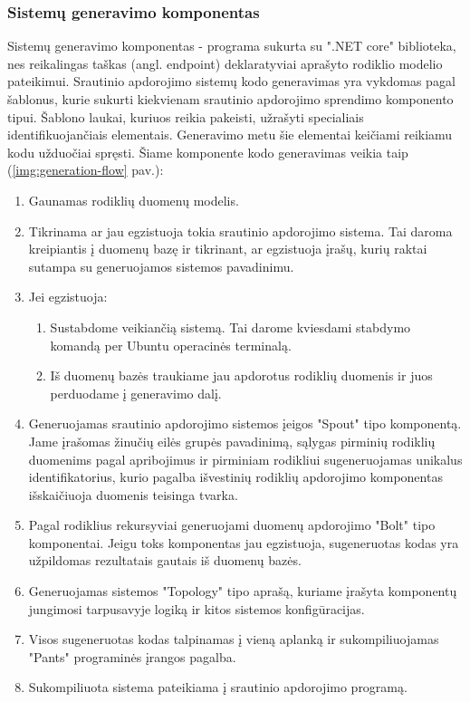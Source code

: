 \documentclass{VUMIFPSbakalaurinis}
\begin{document}
\subsubsection{Sistemų generavimo komponentas}

Sistemų generavimo komponentas - programa sukurta su ".NET core" biblioteka, nes reikalingas taškas (angl. endpoint) deklaratyviai aprašyto rodiklio modelio pateikimui. Srautinio apdorojimo sistemų kodo generavimas yra vykdomas pagal šablonus, kurie sukurti kiekvienam srautinio apdorojimo sprendimo komponento tipui. Šablono laukai, kuriuos reikia pakeisti, užrašyti specialiais identifikuojančiais elementais. Generavimo metu šie elementai keičiami reikiamu kodu užduočiai spręsti.
Šiame komponente kodo generavimas veikia taip (\ref{img:generation-flow} pav.):

\begin{enumerate}
    \item Gaunamas rodiklių duomenų modelis.
    \item Tikrinama ar jau egzistuoja tokia srautinio apdorojimo sistema. Tai daroma kreipiantis į duomenų bazę ir tikrinant, ar egzistuoja įrašų, kurių raktai sutampa su generuojamos sistemos pavadinimu.
    \item Jei egzistuoja:
        \begin{enumerate}
            \item Sustabdome veikiančią sistemą. Tai darome kviesdami stabdymo komandą per Ubuntu operacinės terminalą.
            \item Iš duomenų bazės traukiame jau apdorotus rodiklių duomenis ir juos perduodame į generavimo dalį.
        \end{enumerate} 
    \item Generuojamas srautinio apdorojimo sistemos įeigos "Spout" tipo komponentą. Jame įrašomas žinučių eilės grupės pavadinimą, sąlygas pirminių rodiklių duomenims pagal apribojimus ir pirminiam rodikliui sugeneruojamas unikalus identifikatorius, kurio pagalba išvestinių rodiklių apdorojimo komponentas išskaičiuoja duomenis teisinga tvarka.
    \item Pagal rodiklius rekursyviai generuojami duomenų apdorojimo "Bolt" tipo komponentai. Jeigu toks komponentas jau egzistuoja, sugeneruotas kodas yra užpildomas rezultatais gautais iš duomenų bazės. 
    \item Generuojamas sistemos "Topology" tipo aprašą, kuriame įrašyta komponentų jungimosi tarpusavyje logiką ir kitos sistemos konfigūracijas. 
    \item Visos sugeneruotas kodas talpinamas į vieną aplanką ir sukompiliuojamas "Pants" programinės įrangos pagalba.
    \item Sukompiliuota sistema pateikiama į srautinio apdorojimo programą.
\end{enumerate}
\end{document}

